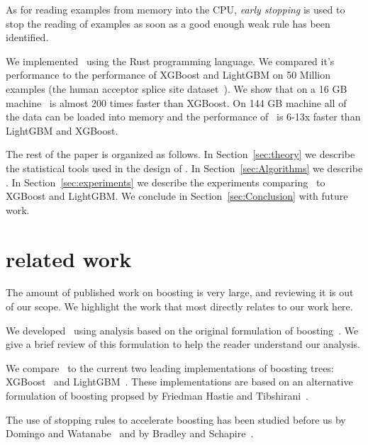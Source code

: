 As for reading examples from memory into the CPU, {\em early stopping}
is used to stop the reading of examples as soon as a good enough weak
rule has been identified.

We implemented \Sparrow\ using the Rust programming language. We
compared it's performance to the performance of XGBoost and LightGBM on
50 Million examples (the human acceptor splice site
dataset~\cite{sonnenburg_coffin_2010, agarwal_reliable_2014}). We
show that on a 16 GB machine \Sparrow\ is almost 200 times faster than
XGBoost. On 144 GB machine all of the data can be loaded into memory
and the performance of \Sparrow\ is 6-13x faster than LightGBM and XGBoost.

The rest of the paper is organized as follows. In Section~\ref{sec:theory} we
describe the statistical tools used in the design of \Sparrow. In
Section~\ref{sec:Algorithms} we describe \Sparrow. In Section~\ref{sec:experiments} we describe
the experiments comparing \Sparrow\ to XGBoost and LightGBM. We
conclude in Section~\ref{sec:Conclusion} with %
future work.

\section{related work}

The amount of published work on boosting is very large, and reviewing
it is out of our scope. We highlight the work that most directly
relates to our work here.

We developed \Sparrow\ using analysis based on the original formulation of
boosting~\cite{freund_alternating_1999, schapire_improved_1999, freund_alternating_1999, schapire_boosting:_2012}. We give a brief
review of this formulation to help the reader understand our analysis.

We compare \Sparrow\ to the current two leading implementations
of boosting trees: XGBoost~\cite{chen_xgboost:_2016} and
LightGBM~\cite{ke_lightgbm:_2017}.
These implementations are based on an alternative formulation of
boosting propsed by Friedman Hastie and
Tibshirani~\cite{friedman_additive_2000}.

The use of stopping rules to accelerate boosting has been studied 
before us by Domingo and Watanabe~\cite{domingo_scaling_2000} and by
Bradley and Schapire~\cite{bradley_filterboost:_2007}.


\iffalse

